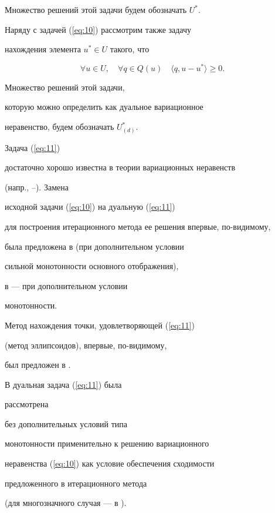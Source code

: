 Множество решений этой задачи будем обозначать $U^{*}$.


Наряду с задачей (\ref{eq:10}) рассмотрим также задачу


нахождения элемента $ u^{*}\in U $ такого, что


\begin{equation}


\label{eq:11}


\forall u \in U, \quad \forall q \in Q(u) \quad


\langle q, u-u^{*} \rangle \geq 0.


\end{equation}


Множество решений этой задачи,


которую можно определить как дуальное вариационное


неравенство, будем обозначать $U^{*}_{(d)}$.


Задача (\ref{eq:11})


достаточно хорошо известна в теории вариационных неравенств


(напр., \cite{ST88}--\cite{BK88}). Замена


исходной задачи (\ref{eq:10}) на дуальную (\ref{eq:11})


для построения итерационного метода ее решения впервые, по-видимому,


была предложена в \cite{AG72} (при дополнительном условии


сильной монотонности основного отображения),


в \cite{Nem81} --- при дополнительном условии


монотонности.


Метод нахождения точки, удовлетворяющей (\ref{eq:11})


(метод эллипсоидов), впервые, по-видимому,


был предложен в \cite{Shor77}.


В \cite{Kon93b} дуальная задача (\ref{eq:11}) была


рассмотрена


без дополнительных условий типа


монотонности применительно к решению вариационного


неравенства (\ref{eq:10}) как условие обеспечения сходимости


предложенного в \cite{Kon93b} итерационного метода


(для многозначного случая --- в \cite{Kon93a}).





